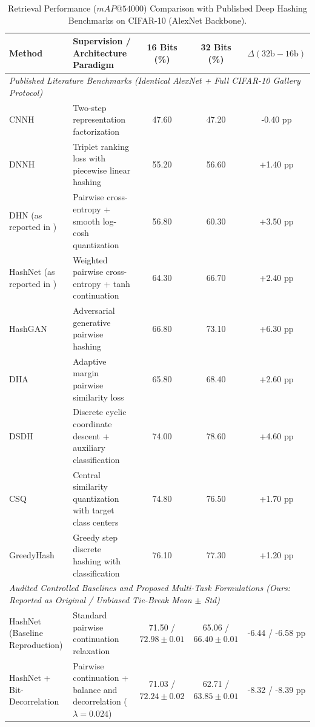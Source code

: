\documentclass[10pt,conference]{IEEEtran}
\begin{document}
\begin{table}[t]
\centering
\caption{Retrieval Performance ($mAP@54000$) Comparison with Published Deep Hashing Benchmarks on CIFAR-10 (AlexNet Backbone).}
\label{tab:sota_comparison}
\begin{tabular}{llccc}
\toprule
\textbf{Method} & \textbf{Supervision / Architecture Paradigm} & \textbf{16 Bits (\%)} & \textbf{32 Bits (\%)} & \textbf{$\Delta (32\text{b} - 16\text{b})$} \\
\midrule
\multicolumn{5}{l}{\textit{Published Literature Benchmarks (Identical AlexNet + Full CIFAR-10 Gallery Protocol)}} \\
CNNH \cite{xia2014supervised} & Two-step representation factorization & 47.60 & 47.20 & -0.40 pp \\
DNNH \cite{lai2015simultaneous} & Triplet ranking loss with piecewise linear hashing & 55.20 & 56.60 & +1.40 pp \\
DHN \cite{zhu2016deep} (as reported in \cite{dubey2021decade,xu2019dha}) & Pairwise cross-entropy + smooth log-cosh quantization & 56.80 & 60.30 & +3.50 pp \\
HashNet \cite{cao2017hashnet} (as reported in \cite{dubey2021decade,xu2019dha}) & Weighted pairwise cross-entropy + tanh continuation & 64.30 & 66.70 & +2.40 pp \\
HashGAN \cite{dizaji2018hashgan} & Adversarial generative pairwise hashing & 66.80 & 73.10 & +6.30 pp \\
DHA \cite{xu2019dha} & Adaptive margin pairwise similarity loss & 65.80 & 68.40 & +2.60 pp \\
DSDH \cite{li2017deep} & Discrete cyclic coordinate descent + auxiliary classification & 74.00 & 78.60 & +4.60 pp \\
CSQ \cite{yuan2020central_similarity} & Central similarity quantization with target class centers & 74.80 & 76.50 & +1.70 pp \\
GreedyHash \cite{su2021greedyhash} & Greedy step discrete hashing with classification & 76.10 & 77.30 & +1.20 pp \\
\midrule
\multicolumn{5}{l}{\textit{Audited Controlled Baselines and Proposed Multi-Task Formulations (Ours: Reported as Original / Unbiased Tie-Break Mean $\pm$ Std)}} \\
HashNet (Baseline Reproduction) & Standard pairwise continuation relaxation & 71.50 / $72.98 \pm 0.01$ & 65.06 / $66.40 \pm 0.01$ & -6.44 / -6.58 pp \\
HashNet + Bit-Decorrelation & Pairwise continuation + balance and decorrelation ($\lambda=0.024$) & 71.03 / $72.24 \pm 0.02$ & 62.71 / $63.85 \pm 0.01$ & -8.32 / -8.39 pp \\

\end{tabular}
\end{table}
\end{document}
